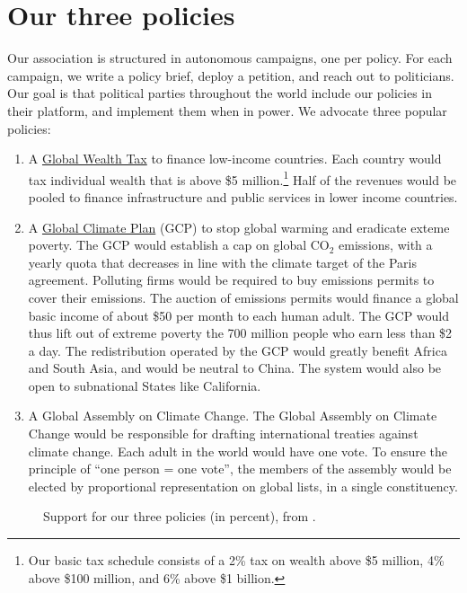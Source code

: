 \documentclass[12pt,english]{article}
\begin{document}
\section{Our three policies}

Our association is structured in autonomous campaigns, one per policy. For each campaign, we write a policy brief, deploy a petition, and reach out to politicians. Our goal is that political parties throughout the world include our policies in their platform, and implement them when in power. We advocate three popular policies:
\begin{enumerate}
  \item A \href{https://github.com/bixiou/global_tax_attitudes/raw/main/paper/policy_brief_tax.pdf}{Global Wealth Tax} to finance low-income countries. Each country would tax individual wealth that is above \$5 million.\footnote{Our basic tax schedule consists of a 2\% tax on wealth above \$5 million, 4\% above \$100 million, and 6\% above \$1 billion.} 
  Half of the revenues would be pooled to finance infrastructure and public services in lower income countries. 
  \item A \href{https://github.com/bixiou/global_tax_attitudes/raw/main/paper/policy_brief_GCP.pdf}{Global Climate Plan} (GCP) to stop global warming and eradicate exteme poverty. The GCP would establish a cap on global CO$_\text{2}$ emissions, with a yearly quota that decreases in line with the climate target of the Paris agreement. Polluting firms would be required to buy emissions permits to cover their emissions. The auction of emissions permits would finance a global basic income of about \$50 per month to each human adult. The GCP would thus lift out of extreme poverty the 700 million people who earn less than \$2 a day. The redistribution operated by the GCP would greatly benefit Africa and South Asia, and would be neutral to China. The system would also be open to subnational States like California. 
  \item A Global Assembly on Climate Change. The Global Assembly on Climate Change would be responsible for drafting international treaties against climate change. Each adult in the world would have one vote. To ensure the principle of ``one person = one vote'', the members of the assembly would be elected by proportional representation on global lists, in a single constituency.
\end{enumerate}

\begin{figure}[h!]
  \caption{Support for our three policies (in percent), from \citet{fabre_international_2023}.}\label{fig:GDPpc}
\end{figure}
\end{document}
